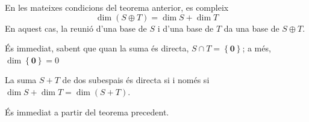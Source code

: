 \begin{corollari}
En les mateixes condicions del teorema anterior, es compleix%
\begin{equation*}
\dim (S\oplus T)=\dim S+\dim T
\end{equation*}%
En aquest cas, la reunió d’una base de $S$ i d’una base de $%
T$ da una base de $S\oplus T$.

\end{corollari}
\begin{prova}
És immediat, sabent que quan la suma és directa, $S\cap 
T=\left\{ \mathbf{0}\right\} $; a més, $\dim \left\{ \mathbf{0}%
\right\} =0$
\end{prova}

\begin{corollari}
La suma $S+T$ de dos subespais és directa si i només
si $\dim S+\dim T=\dim (S+T)$.

\end{corollari}
\begin{prova}
És immediat a partir del teorema precedent.
\end{prova}

